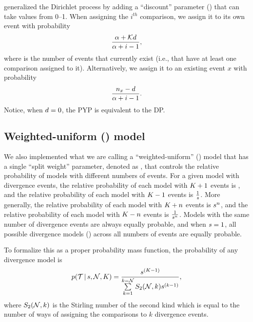 \documentclass[letterpaper,12pt]{article}
\begin{document}
\begin{linenomath}
\citet{PitmanYor1997} generalized the Dirichlet process by adding a
``discount'' parameter (\discount) that can take values from 0--1.
When assigning the $i^{th}$ comparison, we assign it to its own event
with probability
\begin{equation}
    \frac{\alpha + \mathcal{K} d}{\alpha + i - 1},
    \label{eq:pypnewcat}
\end{equation}
where \nexistingcats is the number of events that currently exist (i.e., that have at
least one comparison assigned to it).
Alternatively, we assign it to an existing event $x$ with probability
\begin{equation}
    \frac{n_x - d}{\alpha + i -1}.
    \label{eq:pypexistingcat}
\end{equation}
Notice, when $d = 0$, the PYP is equivalent to the DP.
\end{linenomath}

\subsection{Weighted-uniform (\wunif) model}
We also implemented what we are calling a ``weighted-uniform'' (\wunif) model
that has a single ``split weight'' parameter, denoted as \splitweight, that
controls the relative probability of models with different numbers of events.
For a given model with \nevents divergence events, the relative probability
of each model with $K_{} + 1$ events is \splitweight,
and the relative probability of each model with $K_{} - 1$ events is
$\frac{1}{s}$.
More generally, the relative probability of each model with
$K_{} + n$
events is
$s{}^n$,
and the relative probability of each model with
$K_{} - n$
events is
$\frac{1}{s{}^n}$.
Models with the same number of divergence events
are always equally probable,
and
when $s = 1$, all possible divergence models (\etimesets) across all
numbers of events are equally probable.

\begin{linenomath}
To formalize this as a proper probability mass function,
the probability of any divergence model is
\begin{equation}
    p(\mathcal{T} \,|\, s, \mathcal{N}, K_{}) = 
    \frac{
        s^{(K_{} - 1)}
    }{
        \sum\limits_{k=1}^{k=\mathcal{N}} S_2(\mathcal{N}, k) s^{(k-1)}
    },
    \label{eq:uniformdivmodelprob}
\end{equation}
where $S_2(\mathcal{N}, k)$ is the Stirling number of the second kind which
is equal to the number of ways of assigning the \ncomparisons comparisons to
$k$ divergence events.
\end{linenomath}
\end{document}

